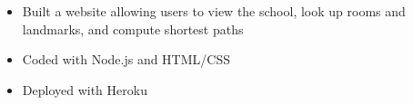 {
	\begin{itemize}
		\item Built a website allowing users to view the school, look up rooms and landmarks, and compute shortest paths
		\item Coded with Node.js and HTML/CSS
		\item Deployed with Heroku
	\end{itemize}
}
